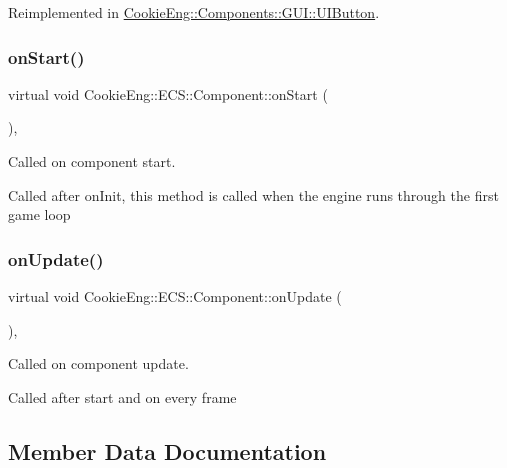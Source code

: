 Reimplemented in \hyperlink{class_cookie_eng_1_1_components_1_1_g_u_i_1_1_u_i_button_ad045368b7a595ddaa70cc18112f98221}{Cookie\+Eng\+::\+Components\+::\+G\+U\+I\+::\+U\+I\+Button}.

\mbox{\label{class_cookie_eng_1_1_e_c_s_1_1_component_aaf8523586d57c3e40d4149f228755139}} 
\subsubsection{\texorpdfstring{on\+Start()}{onStart()}}
{\footnotesize\ttfamily virtual void Cookie\+Eng\+::\+E\+C\+S\+::\+Component\+::on\+Start (\begin{DoxyParamCaption}{ }\end{DoxyParamCaption})\hspace{0.3cm}{\ttfamily [inline]}, {\ttfamily [virtual]}}



Called on component start. 

Called after on\+Init, this method is called when the engine runs through the first game loop \mbox{\label{class_cookie_eng_1_1_e_c_s_1_1_component_a7c4a11f71e21181bc6f56841565b9a56}} 
\subsubsection{\texorpdfstring{on\+Update()}{onUpdate()}}
{\footnotesize\ttfamily virtual void Cookie\+Eng\+::\+E\+C\+S\+::\+Component\+::on\+Update (\begin{DoxyParamCaption}{ }\end{DoxyParamCaption})\hspace{0.3cm}{\ttfamily [inline]}, {\ttfamily [virtual]}}



Called on component update. 

Called after start and on every frame 

\subsection{Member Data Documentation}
\mbox{\label{class_cookie_eng_1_1_e_c_s_1_1_component_a8a0c5a4ee3a87809d3e6d0bdaed3ebbe}} 
